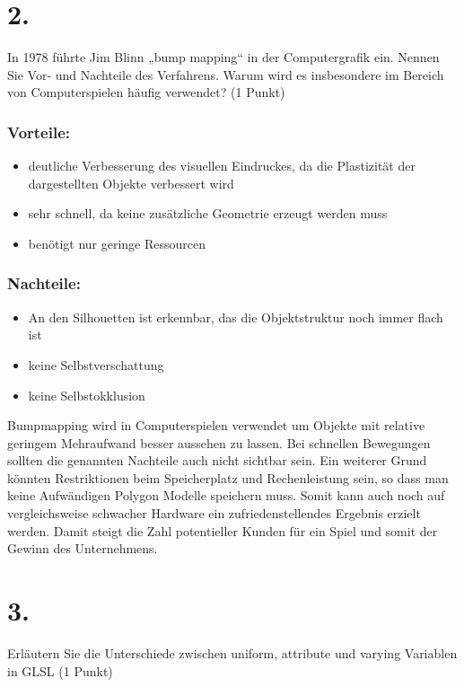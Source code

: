 \documentclass[12pt]{scrreprt}
\begin{document}
\section*{2.}
In 1978 führte Jim Blinn „bump mapping“ in der Computergrafik ein. Nennen Sie Vor- und Nachteile des Verfahrens. Warum wird es insbesondere im Bereich von Computerspielen häufig verwendet? (1 Punkt)

\subsubsection*{Vorteile:}

\begin{itemize}
  \item deutliche Verbesserung des visuellen Eindruckes, da die
    Plastizität der dargestellten Objekte verbessert wird
  \item sehr schnell, da keine zusätzliche Geometrie erzeugt werden muss
  \item benötigt nur geringe Ressourcen
\end{itemize}

\subsubsection*{Nachteile:}

\begin{itemize}
  \item An den Silhouetten ist erkennbar, das die Objektstruktur noch immer flach ist
  \item keine Selbstverschattung
  \item keine Selbstokklusion
\end{itemize}


Bumpmapping wird in Computerspielen verwendet um Objekte mit relative geringem Mehraufwand besser aussehen zu lassen. Bei schnellen Bewegungen sollten die genannten Nachteile auch nicht sichtbar sein.
Ein weiterer Grund könnten Restriktionen beim Speicherplatz und Rechenleistung sein, so dass man keine Aufwändigen Polygon Modelle speichern muss. Somit kann auch noch auf vergleichsweise schwacher Hardware ein
zufriedenstellendes Ergebnis erzielt werden. Damit steigt die Zahl
potentieller Kunden für ein Spiel und somit der Gewinn des Unternehmens.


\section*{3.}
Erläutern Sie die Unterschiede zwischen uniform, attribute und varying Variablen in GLSL (1 Punkt)
\end{document}
